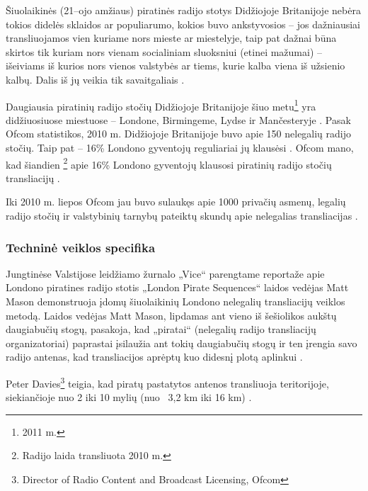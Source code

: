 \documentclass[kursinis-darbas]{vukf}
\begin{document}
Šiuolaikinės (21--ojo amžiaus) piratinės radijo stotys Didžiojoje Britanijoje nebėra tokios didelės sklaidos ar populiarumo, kokios buvo ankstyvosios – jos dažniausiai transliuojamos vien kuriame nors mieste ar miestelyje, taip pat dažnai būna skirtos tik kuriam nors vienam socialiniam sluoksniui (etinei mažumai) – išeiviams iš kurios nors vienos valstybės ar tiems, kurie kalba viena iš užsienio kalbų. Dalis iš jų veikia tik savaitgaliais \cite[p.~238]{chs_encyclopedia_of_radio}.

Daugiausia piratinių radijo stočių Didžiojoje Britanijoje šiuo metu\footnote{2011 m.} yra didžiuosiuose miestuose – Londone, Birmingeme, Lydse ir Mančesteryje \cite{ofcom_illegal_broadcasting_factsheet}. Pasak \gls{Ofcom} statistikos, 2010 m. Didžiojoje Britanijoje buvo apie 150 nelegalių radijo stočių. Taip pat – 16\% Londono gyventojų reguliariai jų klausėsi \cite{bbc_radio_4_do_pirates_rule_the_air_waves}. \gls{Ofcom} mano, kad šiandien \footnote{Radijo laida transliuota 2010 m.} apie 16\% Londono gyventojų klausosi piratinių radijo stočių transliacijų \cite{bbc_radio_4_do_pirates_rule_the_air_waves}.

Iki 2010 m. liepos \gls{Ofcom} jau buvo sulaukęs apie 1000 privačių asmenų, legalių radijo stočių ir valstybinių tarnybų pateiktų skundų apie nelegalias transliacijas \cite{bbc_radio_4_do_pirates_rule_the_air_waves}.


\subsubsection{Techninė veiklos specifika}

Jungtinėse Valstijose leidžiamo žurnalo „Vice“ parengtame reportaže apie Londono piratines radijo stotis „London Pirate Sequences“ \cite{vice_london_pirate_sequences} laidos vedėjas Matt Mason demonstruoja įdomų šiuolaikinių Londono nelegalių transliacijų veiklos metodą. Laidos vedėjas Matt Mason, lipdamas ant vieno iš šešiolikos aukštų daugiabučių stogų, pasakoja, kad „piratai“ (nelegalių radijo transliacijų organizatoriai) paprastai įsilaužia ant tokių daugiabučių stogų ir ten įrengia savo radijo antenas, kad transliacijos aprėptų kuo didesnį plotą aplinkui \cite{vice_london_pirate_sequences}.

Peter Davies\footnote{Director of Radio Content and Broadcast Licensing, \gls{Ofcom}} teigia, kad piratų pastatytos antenos transliuoja teritorijoje, siekiančioje nuo 2 iki 10 mylių (nuo ~3,2 km iki 16 km) \cite{bbc_radio_4_do_pirates_rule_the_air_waves}.
\end{document}
